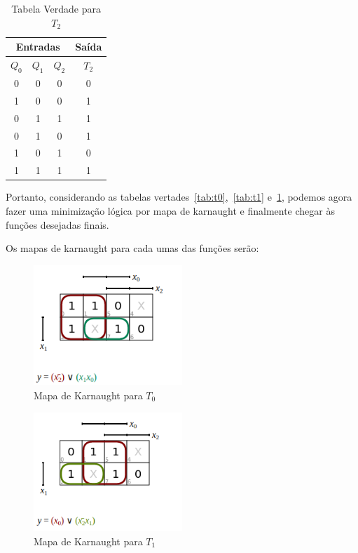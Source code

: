 \documentclass[12pt]{article}
\begin{document}
\begin{table}[H]
    \centering
    \caption{Tabela Verdade para $T_{2}$}
    \begin{tabular}{|c|c|c||c|}\hline
      \multicolumn{3}{|c||}{Entradas} & \multicolumn{1}{|c|}{Saída} \\\hline
      \textbf{$Q_{0}$} & \textbf{$Q_{1}$} & \textbf{$Q_{2}$} & \textbf{$T_{2}$} \\\hline
      0 & 0 & 0 & 0 \\\hline
      1 & 0 & 0 & 1 \\\hline
      0 & 1 & 1 & 1 \\\hline
      0 & 1 & 0 & 1 \\\hline
      1 & 0 & 1 & 0 \\\hline
      1 & 1 & 1 & 1 \\\hline
    \end{tabular}\label{tab:t2}
\end{table}

Portanto, considerando as tabelas vertades~\ref{tab:t0},~\ref{tab:t1}
e~\ref{tab:t2}, podemos agora fazer uma minimização lógica por mapa de karnaught
e finalmente chegar às funções desejadas finais.

Os mapas de karnaught para cada umas das funções serão:

\begin{figure}[H]
  \centering
  \includegraphics[width=0.5\textwidth]{Exp09/images/Q0.png}
  \caption{Mapa de Karnaught para $T_{0}$}\label{fig:Q0.png}
\end{figure}

\begin{figure}[H]
  \centering
  \includegraphics[width=0.5\textwidth]{Exp09/images/Q1.png}
  \caption{Mapa de Karnaught para $T_{1}$}\label{fig:Q1.png}
\end{figure}
\end{document}

